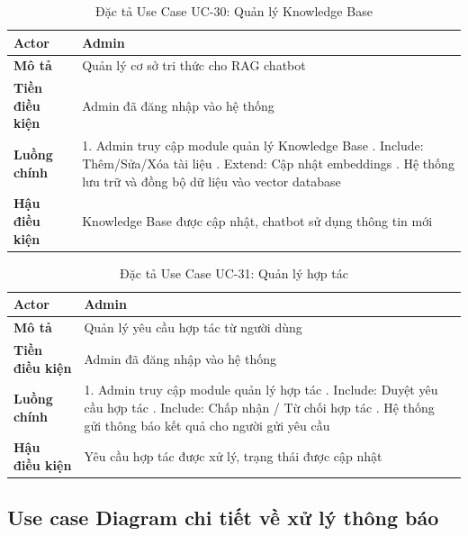 \begin{table}[H]
\centering
\caption{Đặc tả Use Case UC-30: Quản lý Knowledge Base}
\label{tab:uc30}
\begin{tabular}{|p{4cm}|p{11cm}|}
\hline
\textbf{Actor} & Admin \\
\hline
\textbf{Mô tả} & Quản lý cơ sở tri thức cho RAG chatbot \\
\hline
\textbf{Tiền điều kiện} & Admin đã đăng nhập vào hệ thống \\
\hline
\textbf{Luồng chính} & 
1. Admin truy cập module quản lý Knowledge Base \newline
2. Include: Thêm/Sửa/Xóa tài liệu \newline
3. Extend: Cập nhật embeddings \newline
4. Hệ thống lưu trữ và đồng bộ dữ liệu vào vector database \\
\hline
\textbf{Hậu điều kiện} & Knowledge Base được cập nhật, chatbot sử dụng thông tin mới \\
\hline
\end{tabular}
\end{table}

\begin{table}[H]
\centering
\caption{Đặc tả Use Case UC-31: Quản lý hợp tác}
\label{tab:uc31}
\begin{tabular}{|p{4cm}|p{11cm}|}
\hline
\textbf{Actor} & Admin \\
\hline
\textbf{Mô tả} & Quản lý yêu cầu hợp tác từ người dùng \\
\hline
\textbf{Tiền điều kiện} & Admin đã đăng nhập vào hệ thống \\
\hline
\textbf{Luồng chính} & 
1. Admin truy cập module quản lý hợp tác \newline
2. Include: Duyệt yêu cầu hợp tác \newline
3. Include: Chấp nhận / Từ chối hợp tác \newline
4. Hệ thống gửi thông báo kết quả cho người gửi yêu cầu \\
\hline
\textbf{Hậu điều kiện} & Yêu cầu hợp tác được xử lý, trạng thái được cập nhật \\
\hline
\end{tabular}
\end{table}

\subsection{Use case Diagram chi tiết về xử lý thông báo}

